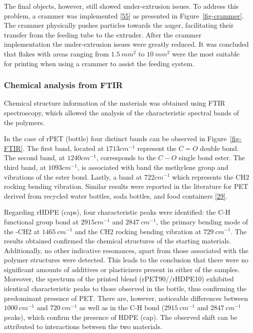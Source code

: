 \documentclass[
]{article}
\begin{document}
The final objects, however, still showed under-extrusion issues. To
address this problem, a crammer was implemented
\protect\hyperlink{ref-little2020}{{[}55{]}} as presented in
Figure~\ref{fig-crammer}. The crammer physically pushes particles
towards the auger, facilitating their transfer from the feeding tube to
the extruder. After the crammer implementation the under-extrusion
issues were greatly reduced. It was concluded that flakes with areas
ranging from \(1.5~mm^{2}\) to \(10~mm^{2}\) were the most suitable for
printing when using a crammer to assist the feeding system.

\hypertarget{chemical-analysis-from-ftir}{%
\subsubsection{Chemical analysis from
FTIR}\label{chemical-analysis-from-ftir}}

Chemical structure information of the materials was obtained using FTIR
spectroscopy, which allowed the analysis of the characteristic spectral
bands of the polymers.

In the case of rPET (bottle) four distinct bands can be observed in
Figure~\ref{fig-FTIR}. The first band, located at \(1713 cm^{-1}\)
represent the \(C=O\) double bond. The second band, at \(1240 cm^{-1}\),
corresponds to the \(C-O\) single bond ester. The third band, at
\(1093 cm^{-1}\), is associated with band the methylene group and
vibrations of the ester bond. Lastly, a band at \(722 cm^{-1}\) which
represents the CH2 rocking bending vibration. Similar results were
reported in the literature for PET derived from recycled water bottles,
soda bottles, and food containers
\protect\hyperlink{ref-zander2018}{{[}29{]}}.

Regarding rHDPE (caps), four characteristic peaks were identified: the
C-H functional group bond at \(2915cm^{-1}\) and \(2847~cm^{-1}\), the
primary bending mode of the -CH2 at \(1465~cm^{-1}\) and the CH2 rocking
bending vibration at \(729 ~cm^{-1}\). The results obtained confirmed
the chemical structures of the starting materials. Additionally, no
other indicative resonances, apart from those associated with the
polymer structures were detected. This leads to the conclusion that
there were no significant amounts of additives or plasticizers present
in either of the samples. Moreover, the spectrum of the printed blend
(rPET90//rHDPE10) exhibited identical characteristic peaks to those
observed in the bottle, thus confirming the predominant presence of PET.
There are, however, noticeable differences between \(1000 ~cm^{-1}\) and
\(720 ~cm^{-1}\) as well as in the C-H bond (\(2915~cm^{-1}\) and
\(2847 ~cm^{-1}\) peaks), which confirm the presence of HDPE (cap). The
observed shift can be attributed to interactions between the two
materials.
\end{document}
